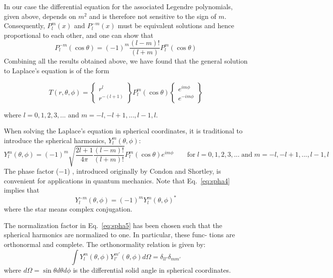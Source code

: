 In our case the differential equation for the associated Legendre polynomials, given above, depends
on $m^2$ and is therefore not sensitive to the sign of $m$.
Consequently, $P_l^m(x)$ and $P_l^{-m}(x)$ must be equivalent solutions and 
hence proportional to each other, and one can show that
\begin{equation}
P_l^{-m}(\cos\theta) = (-1)^m\frac{(l-m)!}{(l+m)} P_l^m(\cos\theta)
\label{eq:spha4}
\end{equation}
Combining all the results obtained above, we have found that the general solution to
Laplace's equation is of the form
\begin{mdframed}[backgroundcolor=blue!5]
\[
T(r,\theta,\phi) = 
\left\{
\begin{array}{c}
r^l \\ r^{-(l+1)}
\end{array}
\right\}
P_l^m(\cos\theta) 
\left\{
\begin{array}{c}
e^{im\phi} \\ e^{-im\phi}
\end{array}
\right\}
\]
\end{mdframed}
where $l=0,1,2,3,...$ and $m=-l,-l+1,...,l-1,l$.

When solving the Laplace's equation in spherical coordinates, it is traditional
to introduce the spherical harmonics, $Y_l^m(\theta,\phi)$:
\begin{equation}
Y_l^m(\theta,\phi) = (-1)^m \sqrt{\frac{2l+1}{4\pi} \frac{(l-m)!}{(l+m)!}} P_l^m(\cos\theta) e^{im\phi}
\qquad 
\textrm{for} \; l=0,1,2,3,... \; \textrm{and} \; m=-l,-l+1,...,l-1,l
\label{eq:spha5}
\end{equation}
The phase factor ($-1$) , introduced originally by Condon and Shortley, is convenient for
applications in quantum mechanics. Note that Eq.~\eqref{eq:spha4} implies that
\[
Y_l^{-m} (\theta, \phi) = (-1)^m Y_l^m (\theta,\phi)^* 
\]
where the star means complex conjugation.

The normalization factor in Eq.~\eqref{eq:spha5} has been
chosen such that the spherical harmonics are normalized to one. In particular, these func-
tions are orthonormal and complete. The orthonormality relation is given by:
\[
\int Y_l^m(\theta,\phi) Y_{l'}^{m'}(\theta,\phi) d\Omega = \delta_{ll'} \delta_{mm'}
\]
where $d\Omega = \sin\theta d\theta d\phi$ is the differential solid angle in spherical coordinates.

